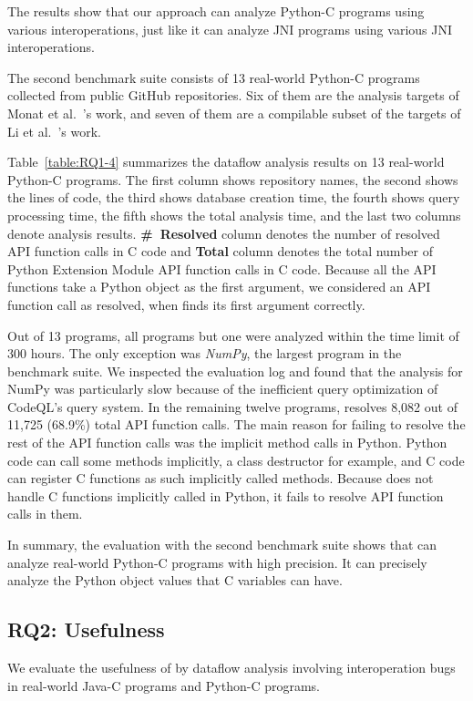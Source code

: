 The results show that our approach can analyze Python-C programs using various
interoperations, just like it can analyze JNI programs using various JNI
interoperations.



The second benchmark suite consists of 13 real-world Python-C programs
collected from public GitHub repositories. Six of them are the analysis targets
of Monat et al.~\cite{sas2021}'s work, and seven of them are a compilable
subset of the targets of Li et al.~\cite{polycruise}'s work.

Table~\ref{table:RQ1-4} summarizes the dataflow analysis results on 13
real-world Python-C programs.  The first column shows repository names, the
second shows the lines of code, the third shows database creation time, the
fourth shows query processing time, the fifth shows the total analysis time,
and the last two columns denote analysis results.  {\bf \#~Resolved} column
denotes the number of resolved API function calls in C code and {\bf Total}
column denotes the total number of Python Extension Module API function calls
in C code.  Because all the API functions take a Python object as the first
argument, we considered an API function call as resolved, when \ours finds its
first argument correctly.

Out of 13 programs, all programs but one were analyzed within the time limit of
300 hours.  The only exception was {\it NumPy}, the largest program in the
benchmark suite.  We inspected the evaluation log and found that the analysis
for NumPy was particularly slow because of the inefficient query optimization
of CodeQL’s query system.  In the remaining twelve programs, \ours resolves
8,082 out of 11,725 (68.9\%) total API function calls.  The main reason for
failing to resolve the rest of the API function calls was the implicit method
calls in Python.  Python code can call some methods implicitly, a class
destructor for example, and C code can register C functions as such implicitly
called methods.  Because \ours does not handle C functions implicitly called in
Python, it fails to resolve API function calls in them.

In summary, the evaluation with the second benchmark suite shows that \ours can
analyze real-world Python-C programs with high precision.  It can precisely
analyze the Python object values that C variables can have.



\subsection{RQ2: Usefulness}
We evaluate the usefulness of \ours by dataflow analysis involving
interoperation bugs in real-world Java-C programs and Python-C programs.

